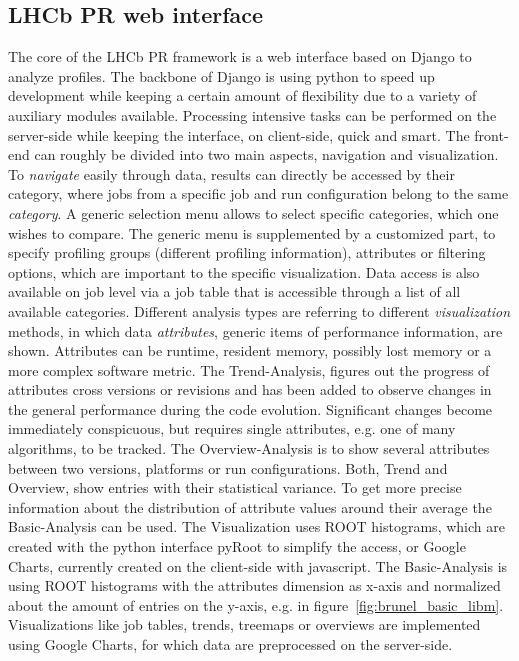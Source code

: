 \documentclass[a4paper]{jpconf}
\begin{document}
\subsection{LHCb PR web interface}
\label{sec:lhcbpr_web_interface}

The core of the LHCb PR framework is a web interface based on Django to analyze profiles. The backbone of Django is using python to speed up development while keeping a certain amount of flexibility due to a variety of auxiliary modules available. Processing intensive tasks can be performed on the server-side while keeping the interface, on client-side, quick and smart.
\newline
The front-end can roughly be divided into two main aspects, navigation and visualization. To \textit{navigate} easily through data, results can directly be accessed by their category, where jobs from a specific job and run configuration belong to the same \textit{category}. A generic selection menu allows to select specific categories, which one wishes to compare. The generic menu is supplemented by a customized part, to specify profiling groups (different profiling information), attributes or filtering options, which are important to the specific visualization. Data access is also available on job level via a job table that is accessible through a list of all available categories.
\newline
Different analysis types are referring to different \textit{visualization} methods, in which data \textit{attributes}, generic items of performance information, are shown. Attributes can be runtime, resident memory, possibly lost memory or a more complex software metric. The Trend-Analysis, figures out the progress of attributes cross versions or revisions and has been added to observe changes in the general performance during the code evolution. Significant changes become immediately conspicuous, but requires single attributes, e.g. one of many algorithms, to be tracked. The Overview-Analysis is to show several attributes between two versions, platforms or run configurations. Both, Trend and Overview, show entries with their statistical variance. To get more precise information about the distribution of attribute values around their average the Basic-Analysis can be used.
\newline
The Visualization uses ROOT histograms, which are created with the python interface pyRoot to simplify the access, or Google Charts, currently created on the client-side with javascript. The Basic-Analysis is using ROOT histograms with the attributes dimension as x-axis and normalized about the amount of entries on the y-axis, e.g. in \mbox{figure \ref{fig:brunel_basic_libm}}. Visualizations like job tables, trends, treemaps or overviews are implemented using Google Charts, for which data are preprocessed on the server-side.
\end{document}
